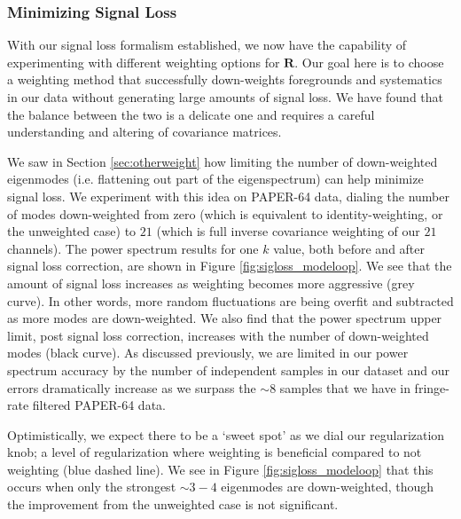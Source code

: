 \documentclass[preprint2,numberedappendix,tighten]{aastex6}  %
\begin{document}
\subsubsection{Minimizing Signal Loss}
\label{sec:Weight}

With our signal loss formalism established, we now have the capability of experimenting with different weighting options for $\textbf{R}$. Our goal here is to choose a weighting method that successfully down-weights foregrounds and systematics in our data without generating large amounts of signal loss. We have found that the balance between the two is a delicate one and requires a careful understanding and altering of covariance matrices.

We saw in Section \ref{sec:otherweight} how limiting the number of down-weighted eigenmodes (i.e. flattening out part of the eigenspectrum) can help minimize signal loss. We experiment with this idea on PAPER-64 data, dialing the number of modes down-weighted from zero (which is equivalent to identity-weighting, or the unweighted case) to $21$ (which is full inverse covariance weighting of our $21$ channels). The power spectrum results for one $k$ value, both before and after signal loss correction, are shown in Figure \ref{fig:sigloss_modeloop}. We see that the amount of signal loss increases as weighting becomes more aggressive (grey curve). In other words, more random fluctuations are being overfit and subtracted as more modes are down-weighted. We also find that the power spectrum upper limit, post signal loss correction, increases with the number of down-weighted modes (black curve). As discussed previously, we are limited in our power spectrum accuracy by the number of independent samples in our dataset and our errors dramatically increase as we surpass the $\sim8$ samples that we have in fringe-rate filtered PAPER-64 data.

Optimistically, we expect there to be a `sweet spot' as we dial our regularization knob; a level of regularization where weighting is beneficial compared to not weighting (blue dashed line). We see in Figure \ref{fig:sigloss_modeloop} that this occurs when only the strongest $\sim3-4$ eigenmodes are down-weighted, though the improvement from the unweighted case is not significant. 
\end{document}
